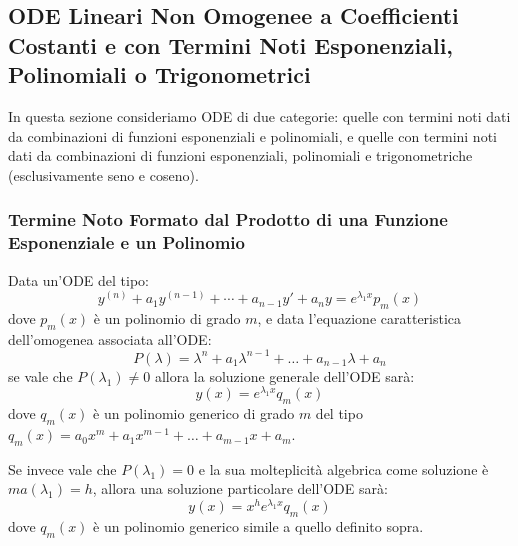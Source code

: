 \documentclass[a4paper,11pt]{article}
\begin{document}
\subsection[ODE Lineari Non Omogenee Particolari]{ODE Lineari Non Omogenee a Coefficienti Costanti e con Termini Noti Esponenziali, Polinomiali o Trigonometrici}
In questa sezione consideriamo ODE di due categorie: quelle con termini noti dati da combinazioni di funzioni esponenziali e polinomiali, e quelle con termini noti dati da combinazioni di funzioni esponenziali, polinomiali e trigonometriche (esclusivamente seno e coseno).

\subsubsection[\texorpdfstring{$f(x)$ da Esponenziale e Polinomio}{f(x) da Esponenziale e Polinomio}]{Termine Noto Formato dal Prodotto di una Funzione Esponenziale e un Polinomio}
Data un'ODE del tipo:
\begin{equation*}
       y^{(n)} + a_1y^{(n-1)} + \cdots + a_{n-1}y' + a_ny = e^{\lambda_1 x}p_m(x)
\end{equation*}
dove $p_m(x)$ è un polinomio di grado $m$, e data l'equazione caratteristica dell'omogenea associata all'ODE:
\begin{equation*}
    P(\lambda) = \lambda^n + a_1\lambda^{n-1} + \ldots + a_{n-1}\lambda + a_n
\end{equation*}
se vale che $P(\lambda_1) \neq 0$ allora la soluzione generale dell'ODE sarà:
\begin{equation*}
    y(x) = e^{\lambda_1 x}q_m(x)
\end{equation*}
dove $q_m(x)$ è un polinomio generico di grado $m$ del tipo $q_m(x) = a_0x^m + a_1x^{m-1} + \ldots + a_{m-1}x+a_m$.

Se invece vale che $P(\lambda_1) = 0$ e la sua molteplicità algebrica come soluzione è $ma(\lambda_1) = h$, allora una soluzione particolare dell'ODE sarà:
\begin{equation*}
    y(x) = x^he^{\lambda_1 x}q_m(x)
\end{equation*}
dove $q_m(x)$ è un polinomio generico simile a quello definito sopra.
\end{document}

